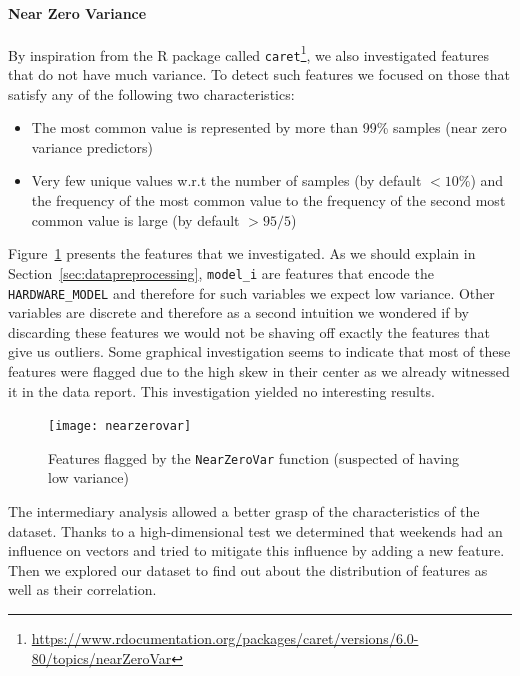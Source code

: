 \paragraph{Near Zero Variance}
By inspiration from the R package called \texttt{caret}\footnote{\url{https://www.rdocumentation.org/packages/caret/versions/6.0-80/topics/nearZeroVar}}, we also investigated features that do not have much variance. To detect such features we focused on those that satisfy any of the following two characteristics:
\begin{itemize}[noitemsep,topsep=0pt]
	\item The most common value is represented by more than 99\% samples (near zero variance predictors)
	\item Very few unique values w.r.t the number of samples (by default $<10\%$) and the frequency of the most common value to the frequency of the second most common value is large (by default $>95/5$)
\end{itemize}

Figure~\ref{nearzerovar} presents the features that we investigated. As we should explain in Section~\ref{sec:datapreprocessing}, \texttt{model\_i} are features that encode the \texttt{HARDWARE\_MODEL} and therefore for such variables we expect low variance. Other variables are discrete and therefore as a second intuition we wondered if by discarding these features we would not be shaving off exactly the features that give us outliers. Some graphical investigation seems to indicate that most of these features were flagged due to the high skew in their center as we already witnessed it in the data report. This investigation yielded no interesting results. 

\begin{figure}[ht]
    \begin{center}
    \texttt{[image: nearzerovar]}
    \end{center}
    \caption{Features flagged by the \texttt{NearZeroVar} function (suspected of having low variance)}
    \label{nearzerovar}
\end{figure}

\vspace{1\baselineskip}
The intermediary analysis allowed a better grasp of the characteristics of the dataset. Thanks to a high-dimensional test we determined that weekends had an influence on vectors and tried to mitigate this influence by adding a new feature. Then we explored our dataset to find out about the distribution of features as well as their correlation. 

